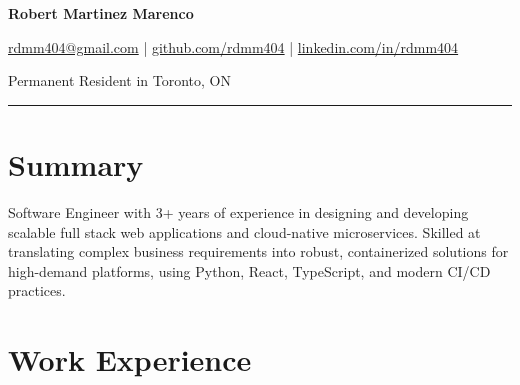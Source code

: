 \documentclass[a4paper,10pt]{article}
\begin{document}
\pagestyle{empty}

\begin{center}
  {\LARGE \textbf{Robert Martinez Marenco}} \\
  \vspace{4pt}

  \href{mailto:rdmm404@gmail.com}{rdmm404@gmail.com} |
  \href{https://github.com/rdmm404}{github.com/rdmm404} |
  \href{https://linkedin.com/in/rdmm404}{linkedin.com/in/rdmm404}

  Permanent Resident in Toronto, ON
\end{center}

\hrule
\vspace{4pt}

\section*{Summary}
Software Engineer with 3+ years of experience in designing and developing scalable full stack web applications
and cloud-native microservices. Skilled at translating complex business requirements into robust, containerized solutions
for high-demand platforms, using Python, React, TypeScript, and modern CI/CD practices.

\section*{Work Experience}
\end{document}
